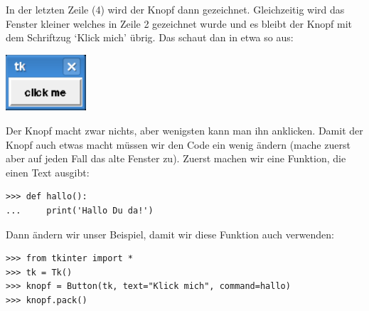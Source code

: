 \par

In der letzten Zeile (4) wird der Knopf dann gezeichnet. Gleichzeitig wird das Fenster kleiner welches in Zeile 2 gezeichnet wurde und es bleibt der Knopf mit dem Schriftzug `Klick mich' übrig. Das schaut dan in etwa so aus:

\begin{center}
\includegraphics*[width=30mm]{images/figure31}
\end{center}

Der Knopf macht zwar nichts, aber wenigsten kann man ihn anklicken. Damit der Knopf auch etwas macht müssen wir den Code ein wenig ändern (mache zuerst aber auf jeden Fall das alte Fenster zu). Zuerst machen wir eine Funktion, die einen Text ausgibt:

\begin{Verbatim}[frame=single]
>>> def hallo():
...     print('Hallo Du da!')
\end{Verbatim}

\noindent
Dann ändern wir unser Beispiel, damit wir diese Funktion auch verwenden:

\begin{Verbatim}[frame=single]
>>> from tkinter import *
>>> tk = Tk()
>>> knopf = Button(tk, text="Klick mich", command=hallo)
>>> knopf.pack()
\end{Verbatim}

